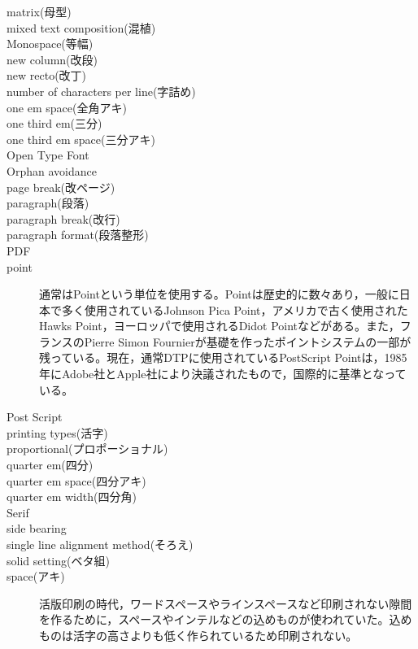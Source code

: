 \begin{description}
    \item[matrix(母型)]
    \item[mixed text composition(混植)]
    \item[Monospace(等幅)]
    \item[new column(改段)]
    \item[new recto(改丁)]
    \item[number of characters per line(字詰め)]
    \item[one em space(全角アキ)]
    \item[one third em(三分)]
    \item[one third em space(三分アキ)]
    \item[Open Type Font]
    \item[Orphan avoidance]
    \item[page break(改ページ)]
    \item[paragraph(段落)]
    \item[paragraph break(改行)]
    \item[paragraph format(段落整形)]
    \item[PDF]
    \item[point]通常はPointという単位を使用する。Pointは歴史的に数々あり，一般に日本で多く使用されているJohnson Pica Point，アメリカで古く使用されたHawks Point，ヨーロッパで使用されるDidot Pointなどがある。また，フランスのPierre Simon Fournierが基礎を作ったポイントシステムの一部が残っている。現在，通常DTPに使用されているPostScript Pointは，1985年にAdobe社とApple社により決議されたもので，国際的に基準となっている\cite{handbook_of_typography}。
    \item[Post Script]
    \item[printing types(活字)]
    \item[proportional(プロポーショナル)]
    \item[quarter em(四分)]
    \item[quarter em space(四分アキ)]
    \item[quarter em width(四分角)]
    \item[Serif]
    \item[side bearing]
    \item[single line alignment method(そろえ)]
    \item[solid setting(ベタ組)]
    \item[space(アキ)]活版印刷の時代，ワードスペースやラインスペースなど印刷されない隙間を作るために，スペースやインテルなどの込めものが使われていた。込めものは活字の高さよりも低く作られているため印刷されない\cite{handbook_of_typography}。

\end{description}
